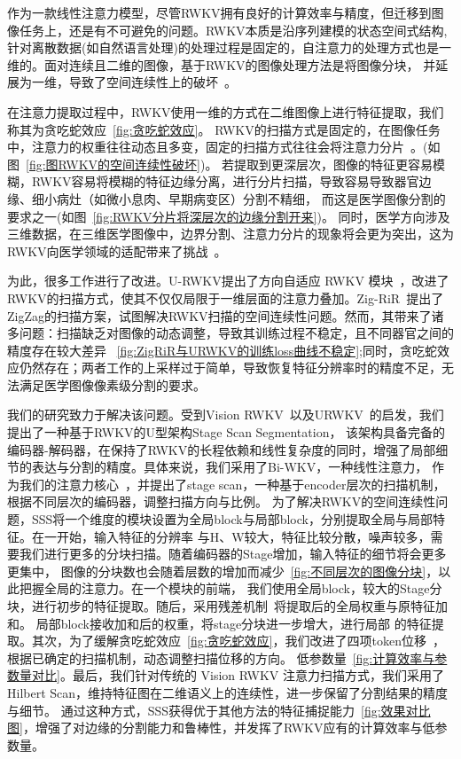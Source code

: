 \documentclass[conference]{IEEEtran}   %
\begin{document}
作为一款线性注意力模型，尽管RWKV拥有良好的计算效率与精度，但迁移到图像任务上，还是有不可避免的问题。RWKV本质是沿序列建模的状态空间式结构,
针对离散数据(如自然语言处理)的处理过程是固定的，自注意力的处理方式也是一维的。面对连续且二维的图像，基于RWKV的图像处理方法是将图像分块，
并延展为一维，导致了空间连续性上的破坏~\cite{zigrir}。

在注意力提取过程中，RWKV使用一维的方式在二维图像上进行特征提取，我们称其为贪吃蛇效应~\ref{fig:贪吃蛇效应}。
RWKV的扫描方式是固定的，在图像任务中，注意力的权重往往动态且多变，固定的扫描方式往往会将注意力分片~\cite{visionrwkv}。(如图~\ref{fig:图RWKV的空间连续性破坏})。
若提取到更深层次，图像的特征更容易模糊，RWKV容易将模糊的特征边缘分离，进行分片扫描，导致容易导致器官边缘、细小病灶（如微小息肉、早期病变区）分割不精细，
而这是医学图像分割的要求之一(如图~\ref{fig:RWKV分片将深层次的边缘分割开来})。
同时，医学方向涉及三维数据，在三维医学图像中，边界分割、注意力分片的现象将会更为突出，这为RWKV向医学领域的适配带来了挑战~\cite{med-urwkv}。

为此，很多工作进行了改进。U-RWKV提出了方向自适应 RWKV 模块~\cite{urwkv}，改进了RWKV的扫描方式，使其不仅仅局限于一维层面的注意力叠加。Zig-RiR~\cite{zigrir}提出了
ZigZag的扫描方案，试图解决RWKV扫描的空间连续性问题。然而，其带来了诸多问题：扫描缺乏对图像的动态调整，导致其训练过程不稳定，且不同器官之间的精度存在较大差异
~\ref{fig:ZigRiR与URWKV的训练loss曲线不稳定};同时，贪吃蛇效应仍然存在；两者工作的上采样过于简单，导致恢复特征分辨率时的精度不足，无法满足医学图像像素级分割的要求。

我们的研究致力于解决该问题。受到Vision RWKV~\cite{vrwkv}以及URWKV~\cite{urwkv}的启发，我们提出了一种基于RWKV的U型架构Stage Scan Segmentation，
该架构具备完备的编码器-解码器，在保持了RWKV的长程依赖和线性复杂度的同时，增强了局部细节的表达与分割的精度。具体来说，我们采用了Bi-WKV，一种线性注意力，
作为我们的注意力核心~\cite{vrwkv}，并提出了stage scan，一种基于encoder层次的扫描机制，根据不同层次的编码器，调整扫描方向与比例。
为了解决RWKV的空间连续性问题，SSS将一个维度的模块设置为全局block与局部block，分别提取全局与局部特征。在一开始，输入特征的分辨率
与H、W较大，特征比较分散，噪声较多，需要我们进行更多的分块扫描。随着编码器的Stage增加，输入特征的细节将会更多更集中，
图像的分块数也会随着层数的增加而减少~\ref{fig:不同层次的图像分块}，以此把握全局的注意力。在一个模块的前端，
我们使用全局block，较大的Stage分块，进行初步的特征提取。随后，采用残差机制~\cite{resnet}将提取后的全局权重与原特征加和。
局部block接收加和后的权重，将stage分块进一步增大，进行局部
的特征提取。其次，为了缓解贪吃蛇效应~\ref{fig:贪吃蛇效应}，我们改进了四项token位移~\cite{vrwkv}，根据已确定的扫描机制，动态调整扫描位移的方向。
低参数量~\ref{fig:计算效率与参数量对比}。最后，我们针对传统的 Vision RWKV 注意力扫描方式，我们采用了 Hilbert Scan，维持特征图在二维语义上的连续性，进一步保留了分割结果的精度与细节。
通过这种方式，SSS获得优于其他方法的特征捕捉能力~\ref{fig:效果对比图}，增强了对边缘的分割能力和鲁棒性，并发挥了RWKV应有的计算效率与低参数量。
\end{document}
